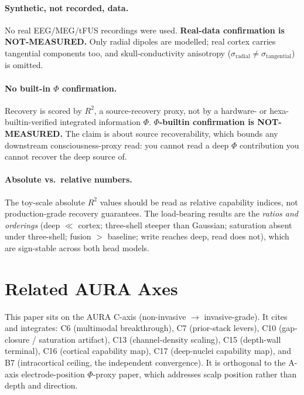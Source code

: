 \documentclass[11pt]{article}
\newcommand{\Rsq}{R^{2}}
\begin{document}
\paragraph{Synthetic, not recorded, data.} No real EEG/MEG/tFUS recordings were used.
\textbf{Real-data confirmation is NOT-MEASURED.} Only radial dipoles are modelled;
real cortex carries tangential components too, and skull-conductivity anisotropy
($\sigma_{\text{radial}}\ne\sigma_{\text{tangential}}$) is omitted.

\paragraph{No built-in $\Phi$ confirmation.} Recovery is scored by $\Rsq$, a
source-recovery proxy, not by a hardware- or hexa-builtin-verified integrated
information $\Phi$. \textbf{$\Phi$-builtin confirmation is NOT-MEASURED.} The claim
is about source recoverability, which bounds any downstream consciousness-proxy
read: you cannot read a deep $\Phi$ contribution you cannot recover the deep source
of.

\paragraph{Absolute vs.\ relative numbers.} The toy-scale absolute $\Rsq$ values
should be read as relative capability indices, not production-grade recovery
guarantees. The load-bearing results are the \emph{ratios and orderings} (deep
$\ll$ cortex; three-shell steeper than Gaussian; saturation absent under three-shell;
fusion $>$ baseline; write reaches deep, read does not), which are sign-stable across
both head models.

\section{Related AURA Axes}
\label{sec:related}

This paper sits on the AURA C-axis (non-invasive $\rightarrow$ invasive-grade). It
cites and integrates: C6 (multimodal breakthrough), C7 (prior-stack levers), C10
(gap-closure / saturation artifact), C13 (channel-density scaling), C15 (depth-wall
terminal), C16 (cortical capability map), C17 (deep-nuclei capability map), and B7
(intracortical ceiling, the independent convergence). It is orthogonal to the
A-axis electrode-position $\Phi$-proxy paper, which addresses scalp position rather
than depth and direction.
\end{document}
